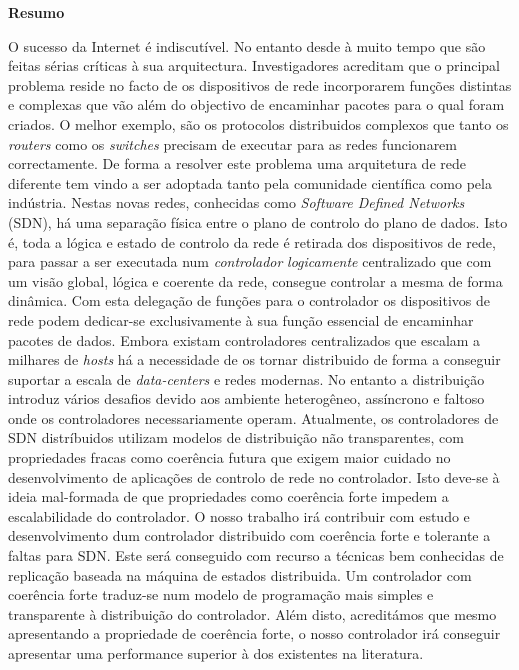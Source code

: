 
\vspace*{2cm}
\begin{center} \Large \bf Resumo
\end{center}
\vspace*{1cm} \setlength{\baselineskip}{0.6cm}
O sucesso da Internet é indiscutível. No entanto desde à muito tempo
que são feitas sérias críticas à sua arquitectura. 
Investigadores acreditam que o principal
problema reside no facto de os dispositivos de rede incorporarem 
funções distintas e complexas que vão além do objectivo de encaminhar pacotes para o qual foram criados. O melhor exemplo, são os protocolos distribuidos complexos que tanto os \emph{routers} como os \emph{switches} precisam de executar para as redes funcionarem correctamente. De forma a resolver este problema
uma arquitetura de rede diferente tem vindo a ser adoptada 
 tanto pela comunidade científica como pela indústria. Nestas novas redes, conhecidas como  \emph{Software Defined Networks} (SDN), há uma separação física entre o plano de controlo do plano de dados. Isto é, toda a lógica e estado de controlo da rede  é retirada dos dispositivos de rede, para passar a ser executada num \emph{controlador} \emph{logicamente} centralizado que com um visão global, lógica e coerente da rede, consegue controlar a mesma de forma dinâmica. Com esta delegação de funções para o controlador os dispositivos de rede podem dedicar-se exclusivamente à sua função essencial de encaminhar pacotes de dados. 
Embora existam controladores centralizados que escalam a milhares de \emph{hosts} há a necessidade de os tornar distribuido de forma a conseguir suportar a escala de \emph{data-centers} e redes modernas. No entanto a distribuição introduz vários desafios devido aos ambiente heterogêneo, assíncrono e faltoso onde os controladores necessariamente operam. 
Atualmente, os controladores de SDN distríbuidos utilizam modelos de distribuição não transparentes, com propriedades fracas como coerência futura que exigem maior cuidado no desenvolvimento de aplicações de controlo de rede no controlador. Isto deve-se à ideia mal-formada de que propriedades como coerência forte impedem a escalabilidade do controlador. 
O nosso trabalho irá contribuir com estudo e desenvolvimento dum controlador distribuido com coerência forte e tolerante a faltas para SDN. Este será conseguido com recurso a técnicas bem conhecidas de replicação baseada na máquina de estados distribuida. Um controlador com coerência forte traduz-se num modelo de programação mais simples e transparente à distribuição do controlador. Além disto, acreditámos que mesmo apresentando a propriedade de coerência forte, o nosso controlador irá conseguir apresentar uma performance superior à dos existentes na literatura. 

